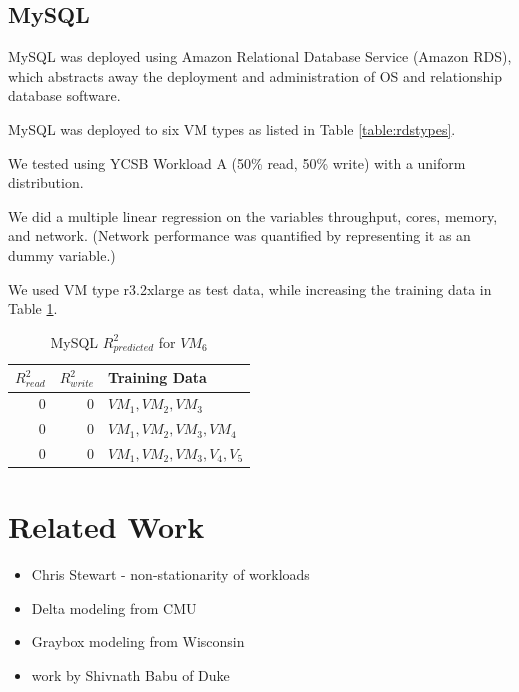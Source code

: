 \documentclass{acm_proc_article-sp}
\begin{document}


\subsection{MySQL}

MySQL was deployed using Amazon Relational Database Service (Amazon RDS), which abstracts away the deployment and administration of OS and relationship database software.

MySQL was deployed to six VM types as listed in Table \ref{table:rdstypes}.

We tested using YCSB Workload A (50\% read, 50\% write) with a uniform distribution.

We did a multiple linear regression on the variables throughput, cores, memory, and network.  (Network performance was quantified by representing it as an dummy variable.)

We used VM type r3.2xlarge as test data, while increasing the training data in Table \ref{table:mysql}.

\begin{table}
\centering
\caption{MySQL $R_{predicted}^2$ for $VM_6$}
\begin{tabular}{|r|r|l|} \hline
$R_{read}^2$&$R_{write}^2$&Training Data\\ \hline
0 & 0& $VM_1,VM_2,VM_3$\\ \hline
0 & 0& $VM_1,VM_2,VM_3,VM_4$\\ \hline
0 & 0& $VM_1,VM_2,VM_3,V_4,V_5$\\ \hline
\hline\end{tabular}
\label{table:mysql}
\end{table}

\section{Related Work}
\label{sec:related}

\begin{itemize}
   \item Chris Stewart - non-stationarity of workloads
   \item Delta modeling from CMU
   \item Graybox modeling from Wisconsin
   \item work by Shivnath Babu of Duke
\end{itemize}
\end{document}
